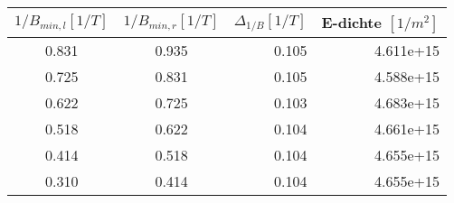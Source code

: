 \begin{tabular}{ccrr}
\toprule
 $1/B_{min, l}[1/\si{T}] $&  $1/B_{min, r}[1/\si{T}] $ & $ \Delta_{1/B}[1/\si{T}]$ &  E-dichte $[1/\si{m}^2]$\\
\midrule
       0.831 &         0.935 &         0.105 &  4.611e+15 \\
       0.725 &         0.831 &         0.105 &  4.588e+15 \\
       0.622 &         0.725 &         0.103 &  4.683e+15 \\
       0.518 &         0.622 &         0.104 &  4.661e+15 \\
       0.414 &         0.518 &         0.104 &  4.655e+15 \\
       0.310 &         0.414 &         0.104 &  4.655e+15 \\
\bottomrule
\end{tabular}
